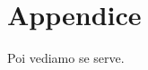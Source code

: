 \chapter[Appendice]{\centering Appendice}
\renewcommand{\baselinestretch}{1.5}
\fontsize{14}{14}\selectfont
Poi vediamo se serve.
